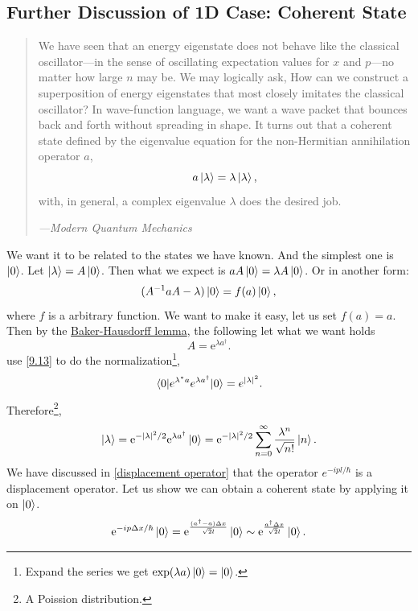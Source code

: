 \documentclass{article}
\theoremstyle{1}
\newcommand{\ee}{\mathrm{e}}
\begin{document}
\subsection{Further Discussion of 1D Case: Coherent State}
\begin{quotation}
    We have seen that an energy eigenstate does not behave like the classical
oscillator—in the sense of oscillating expectation values for $x$ and $p$—no matter
how large $n$ may be. We may logically ask, How can we construct a superposition
of energy eigenstates that most closely imitates the classical oscillator? In wave-function language, we want a wave packet that bounces back and forth without
spreading in shape. It turns out that a coherent state defined by the eigenvalue
equation for the non-Hermitian annihilation operator $a$,
$$a\ket{\lambda}=\lambda\ket{\lambda},$$
with, in general, a complex eigenvalue $\lambda$ does the desired job. 
\begin{flushright}
    {\raggedleft \textit{---Modern Quantum Mechanics}}
\end{flushright}
\end{quotation}
We want it to be related to the states we have known. And the simplest one is $\ket{0}$. Let $\ket{\lambda}=A\ket{0}$. Then what we expect is $aA\ket{0}=\lambda A\ket{0}$. Or in another form:
\begin{equation*}
    (A^{-1}aA-\lambda)\ket{0}=f(a)\ket{0},
\end{equation*}
where $f$ is a arbitrary function. We want to make it easy, let us set $f(a)=a$. Then by the \hyperref[Baker-Hausdorff lemma]{Baker-Hausdorff lemma}, the following let what we want holds
\begin{equation}
    A=\ee^{\lambda a^\dagger}.
\end{equation}
use \eqref{9.13} to do the normalization\footnote{Expand the series we get $\exp(\lambda a)\ket{0}=\ket{0}$.},
\begin{equation}
    \expval{e^{\lambda^* a}e^{\lambda a^\dagger}}{0}=e^{\left|\lambda\right|^2}.
\end{equation}
Therefore\footnote{A Poission distribution.},
\begin{equation}
    \ket{\lambda}=\ee^{-\left|\lambda\right|^2/2}\ee^{\lambda a^\dagger}\ket{0}=\ee^{-\left|\lambda\right|^2/2}\sum_{n=0}^{\infty}\frac{\lambda^n}{\sqrt{n!}}\ket{n}.
\end{equation}
We have discussed in \ref{displacement operator} that the operator $e^{-i  pl/\hbar}$ is a displacement operator. Let us show we can obtain a coherent state by applying it on $\ket{0}$.
\begin{equation}
    \ee^{-ip\Delta x/\hbar}\ket{0}=\ee^{\frac{(a^\dagger-a)\Delta x}{\sqrt{2}l}}\ket{0}\sim \ee^{\frac{a^\dagger \Delta x}{\sqrt{2}l}}\ket{0}.
\end{equation}
\end{document}

